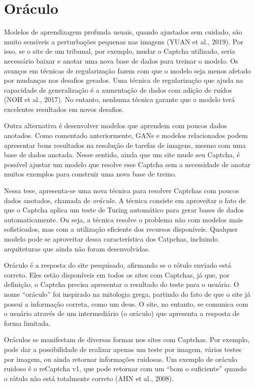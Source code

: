 \documentclass[12pt,twoside,brazilian]{book}
\begin{document}
\hypertarget{sec-intro-oraculo}{%
\section{Oráculo}\label{sec-intro-oraculo}}

Modelos de aprendizagem profunda usuais, quando ajustados sem cuidado,
são muito sensíveis a perturbações pequenas nas imagens (YUAN et al.,
2019). Por isso, se o site de um tribunal, por exemplo, mudar o Captcha
utilizado, seria necessário baixar e anotar uma nova base de dados para
treinar o modelo. Os avanços em técnicas de regularização fazem com que
o modelo seja menos afetado por mudanças nos desafios gerados. Uma
técnica de regularização que ajuda na capacidade de generalização é a
aumentação de dados com adição de ruídos (NOH et al., 2017). No entanto,
nenhuma técnica garante que o modelo terá excelentes resultados em novos
desafios.

Outra alternativa é desenvolver modelos que aprendem com poucos dados
anotados. Como comentado anteriormente, GANs e modelos relacionados
podem apresentar bons resultados na resolução de tarefas de imagens,
mesmo com uma base de dados anotada. Nesse sentido, ainda que um site
mude seu Captcha, é possível ajustar um modelo que resolve esse Captcha
sem a necessidade de anotar muitos exemplos para construir uma nova base
de treino.

Nessa tese, apresenta-se uma nova técnica para resolver Captchas com
poucos dados anotados, chamada de \emph{oráculo}. A técnica consiste em
aproveitar o fato de que o Captcha aplica um teste de Turing automático
para gerar bases de dados automaticamente. Ou seja, a técnica resolve o
problema não com modelos mais sofisticados, mas com a utilização
eficiente dos recursos disponíveis. Qualquer modelo pode se aproveitar
dessa característica dos Catpchas, incluindo arquiteturas que ainda não
foram desenvolvidas.

Oráculo é a resposta do site pesquisado, afirmando se o rótulo enviado
está correto. Eles estão disponíveis em todos os sites com Captchas, já
que, por definição, o Captcha precisa apresentar o resultado do teste
para o usuário. O nome ``oráculo'' foi inspirado na mitologia grega,
partindo do fato de que o site já possui a informação correta, como um
deus. O site, no entanto, se comunica com o usuário através de um
intermediário (o oráculo) que apresenta a resposta de forma limitada.

Oráculos se manifestam de diversas formas nos sites com Captchas. Por
exemplo, pode dar a possibilidade de realizar apenas um teste por
imagem, vários testes por imagem, ou ainda retornar informações
ruidosas. Um exemplo de oráculo ruidoso é o reCaptcha v1, que pode
retornar com um ``bom o suficiente'' quando o rótulo não está totalmente
correto (AHN et al., 2008).
\end{document}
